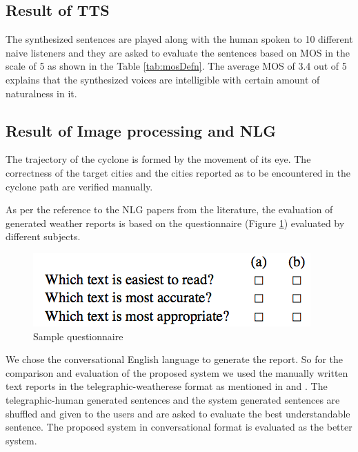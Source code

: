 \documentclass{article}
\begin{document}
\subsection{Result of TTS}
\label{ssec:ttsResults}

The synthesized sentences are played along with the human spoken to 10 different naive listeners and they are asked to evaluate the sentences based on MOS in the scale of 5 as shown in the Table \ref{tab:mosDefn}. The average MOS of 3.4 out of 5 explains that the synthesized voices are intelligible with certain amount of naturalness in it. 

\subsection{Result of Image processing and NLG }
\label{ssec:imgResults}

The trajectory of the cyclone is formed by the movement of its eye. The correctness of the target cities and the cities reported as to be encountered in the cyclone path are verified manually. 

As per the reference to the NLG papers from the literature, the evaluation of generated weather reports is based on the questionnaire (Figure \ref{fig:questionare}) evaluated by different subjects. 

\begin{figure}[h!tb]
\centering
\includegraphics[scale=0.55]{figures/questionnare.png}
\caption{Sample questionnaire}
\label{fig:questionare}
\end{figure}

We chose the conversational English language to generate the report. So for the comparison and evaluation of the proposed system we used the manually written text reports in the telegraphic-weatherese format as mentioned in \cite{forecast} and \cite{Reiter}. The telegraphic-human generated sentences and the system generated sentences are shuffled and given to the users and are asked to evaluate the best understandable sentence. The proposed system in conversational format is evaluated as the better system.

\clearpage 



\end{document}
